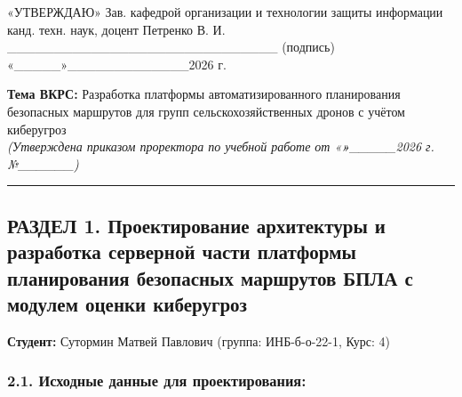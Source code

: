 «УТВЕРЖДАЮ» Зав. кафедрой организации и технологии защиты информации канд. техн. наук, доцент Петренко В. И. \_\_\_\_\_\_\_\_\_\_\_\_\_\_\_\_\_\_\_\_\_\_\_\_\_\_\_\_\_ (подпись) «\_\_\_\_\_»\_\_\_\_\_\_\_\_\_\_\_\_\_2026 г.

\textbf{Тема ВКРС:} Разработка платформы автоматизированного планирования безопасных маршрутов для групп сельскохозяйственных дронов с учётом киберугроз\\
\emph{(Утверждена приказом проректора по учебной работе от «\textbf{\emph{»}}\_\_\_\_\_2026 г. №\_\_\_\_\_\_)}

\begin{center}\rule{0.5\linewidth}{0.5pt}\end{center}

\hypertarget{ux440ux430ux437ux434ux435ux43b-1.-ux43fux440ux43eux435ux43aux442ux438ux440ux43eux432ux430ux43dux438ux435-ux430ux440ux445ux438ux442ux435ux43aux442ux443ux440ux44b-ux438-ux440ux430ux437ux440ux430ux431ux43eux442ux43aux430-ux441ux435ux440ux432ux435ux440ux43dux43eux439-ux447ux430ux441ux442ux438-ux43fux43bux430ux442ux444ux43eux440ux43cux44b-ux43fux43bux430ux43dux438ux440ux43eux432ux430ux43dux438ux44f-ux431ux435ux437ux43eux43fux430ux441ux43dux44bux445-ux43cux430ux440ux448ux440ux443ux442ux43eux432-ux431ux43fux43bux430-ux441-ux43cux43eux434ux443ux43bux435ux43c-ux43eux446ux435ux43dux43aux438-ux43aux438ux431ux435ux440ux443ux433ux440ux43eux437}{%
\subsection{РАЗДЕЛ 1. Проектирование архитектуры и разработка серверной части платформы планирования безопасных маршрутов БПЛА с модулем оценки киберугроз}\label{ux440ux430ux437ux434ux435ux43b-1.-ux43fux440ux43eux435ux43aux442ux438ux440ux43eux432ux430ux43dux438ux435-ux430ux440ux445ux438ux442ux435ux43aux442ux443ux440ux44b-ux438-ux440ux430ux437ux440ux430ux431ux43eux442ux43aux430-ux441ux435ux440ux432ux435ux440ux43dux43eux439-ux447ux430ux441ux442ux438-ux43fux43bux430ux442ux444ux43eux440ux43cux44b-ux43fux43bux430ux43dux438ux440ux43eux432ux430ux43dux438ux44f-ux431ux435ux437ux43eux43fux430ux441ux43dux44bux445-ux43cux430ux440ux448ux440ux443ux442ux43eux432-ux431ux43fux43bux430-ux441-ux43cux43eux434ux443ux43bux435ux43c-ux43eux446ux435ux43dux43aux438-ux43aux438ux431ux435ux440ux443ux433ux440ux43eux437}}

\textbf{Студент:} Сутормин Матвей Павлович (группа: ИНБ-б-о-22-1, Курс: 4)

\hypertarget{ux438ux441ux445ux43eux434ux43dux44bux435-ux434ux430ux43dux43dux44bux435-ux434ux43bux44f-ux43fux440ux43eux435ux43aux442ux438ux440ux43eux432ux430ux43dux438ux44f}{%
\subsubsection{2.1. Исходные данные для проектирования:}\label{ux438ux441ux445ux43eux434ux43dux44bux435-ux434ux430ux43dux43dux44bux435-ux434ux43bux44f-ux43fux440ux43eux435ux43aux442ux438ux440ux43eux432ux430ux43dux438ux44f}}

